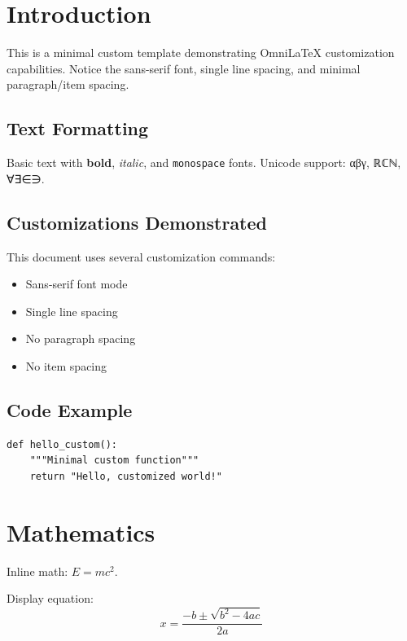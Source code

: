 \documentclass[
    language=english,
    doctype=book,              %
    institution=none,        %
    oneside,                 %
    loadGlossaries=true,          %
]{../../omnilatex}
\begin{document}
\maketitle

\tableofcontents

\chapter{Introduction}

This is a minimal custom template demonstrating OmniLaTeX customization capabilities.
Notice the sans-serif font, single line spacing, and minimal paragraph/item spacing.

\section{Text Formatting}

Basic text with \textbf{bold}, \textit{italic}, and \texttt{monospace} fonts.
Unicode support: αβγ, ℝℂℕ, ∀∃∈∋.

\section{Customizations Demonstrated}

This document uses several customization commands:
\begin{itemize}
    \item Sans-serif font mode
    \item Single line spacing
    \item No paragraph spacing
    \item No item spacing
\end{itemize}

\section{Code Example}

\begin{verbatim}
def hello_custom():
    """Minimal custom function"""
    return "Hello, customized world!"
\end{verbatim}

\chapter{Mathematics}

Inline math: $E = mc^2$.

Display equation:
\begin{equation}
    x = \frac{-b \pm \sqrt{b^2 - 4ac}}{2a}
\end{equation}
\end{document}
